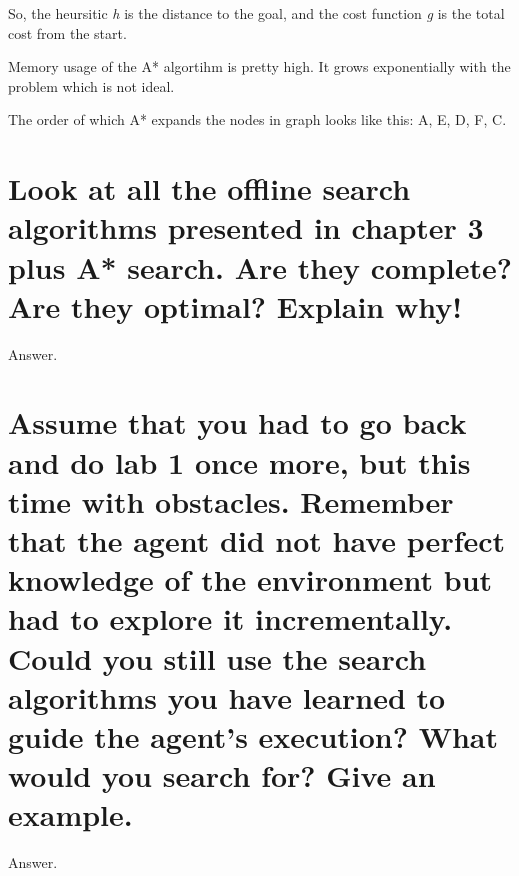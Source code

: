\documentclass{article}
\begin{document}
So, the heursitic \textit{h} is the distance to the goal, and the cost function \textit{g} is the total cost from the start.

Memory usage of the A* algortihm is pretty high. It grows exponentially with the problem which is not ideal.

The order of which A* expands the nodes in graph looks like this: A, E, D, F, C.

\section{Look at all the offline search algorithms presented in chapter 3 plus A* search. Are they complete? Are they optimal? Explain why!}

Answer.

\section{Assume that you had to go back and do lab 1 once more, but this time with obstacles. Remember that the agent did not have perfect knowledge of the environment but had to explore it incrementally. Could you still use the search algorithms you have learned to guide the agent's execution? What would you search for? Give an example.}

Answer.
\end{document}
